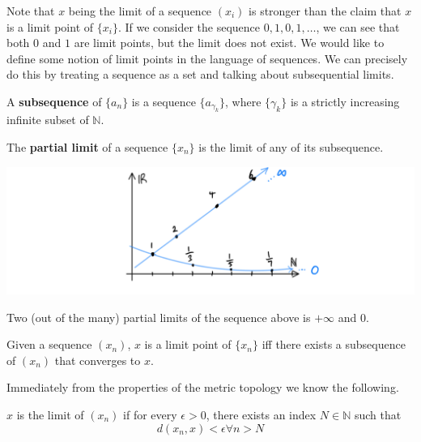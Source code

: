   Note that $x$ being the limit of a sequence $(x_i)$ is stronger than the claim that $x$ is a limit point of $\{x_i\}$. If we consider the sequence $0, 1, 0, 1, \ldots$, we can see that both $0$ and $1$ are limit points, but the limit does not exist. We would like to define some notion of limit points in the language of sequences. We can precisely do this by treating a sequence as a set and talking about subsequential limits. 

  \begin{definition}[Subsequences]
    A \textbf{subsequence} of $\{ a_n\}$ is a sequence $\{a_{\gamma_k}\}$, where $\{\gamma_k\}$ is a strictly increasing infinite subset of $\mathbb{N}$. 
  \end{definition}

  \begin{definition}
    The \textbf{partial limit} of a sequence $\{x_n\}$ is the limit of any of its subsequence.  
    \begin{center}
        \includegraphics[scale=0.26]{img/Partial_Limit.PNG}
    \end{center}
    Two (out of the many) partial limits of the sequence above is $+\infty$ and $0$. 
  \end{definition}

  \begin{lemma}
    Given a sequence $(x_n)$, $x$ is a limit point of $\{x_n\}$ iff there exists a subsequence of $(x_n)$ that converges to $x$. 
  \end{lemma}

  Immediately from the properties of the metric topology we know the following. 

  \begin{definition}
    $x$ is the limit of $(x_n)$ if for every $\epsilon>0$, there exists an index $N \in \mathbb{N}$ such that
    \begin{equation}
      d(x_n, x) < \epsilon \forall n > N
    \end{equation}
  \end{definition}

